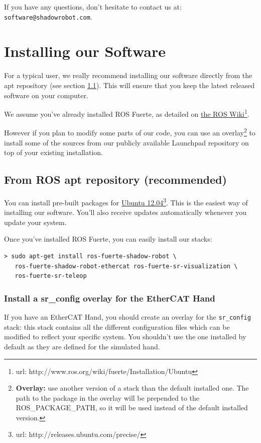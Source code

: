 \documentclass[12pt]{article}
\newcommand{\betterhref}[2]{\href{#1}{#2}\footnote{url: #1}}
\begin{document}
\par If you have any questions, don't hesitate to contact us at: \texttt{software@shadowrobot.com}.\\

\newpage

\section{Installing our Software}
\label{sec:install}
\par For a typical user, we really recommend installing our software directly from the apt repository (see section \ref{sec:install-apt}). This will ensure that you keep the latest released software on your computer.\\

\par We assume you've already installed ROS Fuerte, as detailed on \betterhref{http://www.ros.org/wiki/fuerte/Installation/Ubuntu}{the ROS Wiki}.\\

\par However if you plan to modify some parts of our code, you can use an overlay\footnote{\textbf{Overlay:} use another version of a stack than the default installed one. The path to the package in the overlay will be prepended to the ROS\_PACKAGE\_PATH, so it will be used instead of the default installed version.} to install some of the sources from our publicly available Launchpad repository on top of your existing installation.

\subsection{From ROS apt repository (recommended)}
\label{sec:install-apt}
\par You can install pre-built packages for \betterhref{http://releases.ubuntu.com/precise/}{Ubuntu 12.04}. This is the easiest way of installing our software. You'll also receive updates automatically whenever you update your system.

Once you've installed ROS Fuerte, you can easily install our stacks:
  \begin{lstlisting}
> sudo apt-get install ros-fuerte-shadow-robot \
   ros-fuerte-shadow-robot-ethercat ros-fuerte-sr-visualization \
   ros-fuerte-sr-teleop
  \end{lstlisting}

\subsubsection{Install a sr\_config overlay for the EtherCAT Hand}
\label{sec:install-cfg}
\par If you have an EtherCAT Hand, you should create an overlay for the \texttt{sr\_config} stack: this stack contains all the different configuration files which can be modified to reflect your specific system. You shouldn't use the one installed by default as they are defined for the simulated hand.\\
\end{document}
